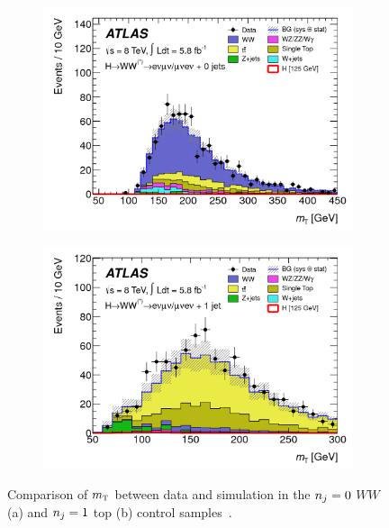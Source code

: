 \begin{figure}[h!]
  \centering
  \captionsetup{justification=centering}

   \begin{subfigure}[t]{0.5\textwidth}
        \centering
        \includegraphics[width=\textwidth]{figures/disc_mt_wwcr}
        \caption{}
    \end{subfigure}%
    \begin{subfigure}[t]{0.5\textwidth}
        \centering
        \includegraphics[width=\textwidth]{figures/disc_mt_topcr}
        \caption{}
    \end{subfigure}


   \caption{Comparison of $m_{\textrm{\footnotesize\sc t}}$ between data and simulation in the $n_j = 0$ $WW$ (a) and $n_j = 1$ top (b) control samples~\cite{Discovery}.}
  \label{fig:disc_mt_cr}
\end{figure}

